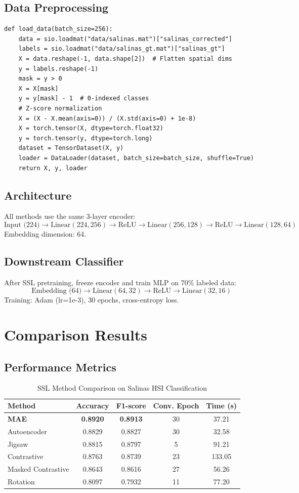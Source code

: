 \documentclass[11pt,a4paper]{article}
\begin{document}
\subsection{Data Preprocessing}
\begin{lstlisting}
def load_data(batch_size=256):
    data = sio.loadmat("data/salinas.mat")["salinas_corrected"]
    labels = sio.loadmat("data/salinas_gt.mat")["salinas_gt"]
    X = data.reshape(-1, data.shape[2])  # Flatten spatial dims
    y = labels.reshape(-1)
    mask = y > 0
    X = X[mask]
    y = y[mask] - 1  # 0-indexed classes
    # Z-score normalization
    X = (X - X.mean(axis=0)) / (X.std(axis=0) + 1e-8)
    X = torch.tensor(X, dtype=torch.float32)
    y = torch.tensor(y, dtype=torch.long)
    dataset = TensorDataset(X, y)
    loader = DataLoader(dataset, batch_size=batch_size, shuffle=True)
    return X, y, loader
\end{lstlisting}

\subsection{Architecture}
All methods use the same 3-layer encoder:
$$\text{Input (224)} \to \text{Linear}(224, 256) \to \text{ReLU} \to \text{Linear}(256, 128) \to \text{ReLU} \to \text{Linear}(128, 64)$$
Embedding dimension: 64.

\subsection{Downstream Classifier}
After SSL pretraining, freeze encoder and train MLP on 70\% labeled data:
$$\text{Embedding (64)} \to \text{Linear}(64, 32) \to \text{ReLU} \to \text{Linear}(32, 16)$$
Training: Adam (lr=1e-3), 30 epochs, cross-entropy loss.

\section{Comparison Results}

\subsection{Performance Metrics}

\begin{table}[h]
\centering
\small
\caption{SSL Method Comparison on Salinas HSI Classification}
\label{tab:results}
\begin{tabular}{lcccc}
\toprule
\textbf{Method} & \textbf{Accuracy} & \textbf{F1-score} & \textbf{Conv. Epoch} & \textbf{Time (s)} \\
\midrule
\textbf{MAE} & \textbf{0.8920} & \textbf{0.8913} & 30 & 37.21 \\
Autoencoder & 0.8829 & 0.8827 & 30 & 32.58 \\
Jigsaw & 0.8815 & 0.8797 & 5 & 91.21 \\
Contrastive & 0.8763 & 0.8739 & 23 & 133.05 \\
Masked Contrastive & 0.8643 & 0.8616 & 27 & 56.26 \\
Rotation & 0.8097 & 0.7932 & 11 & 77.20 \\
\bottomrule
\end{tabular}
\end{table}
\end{document}
